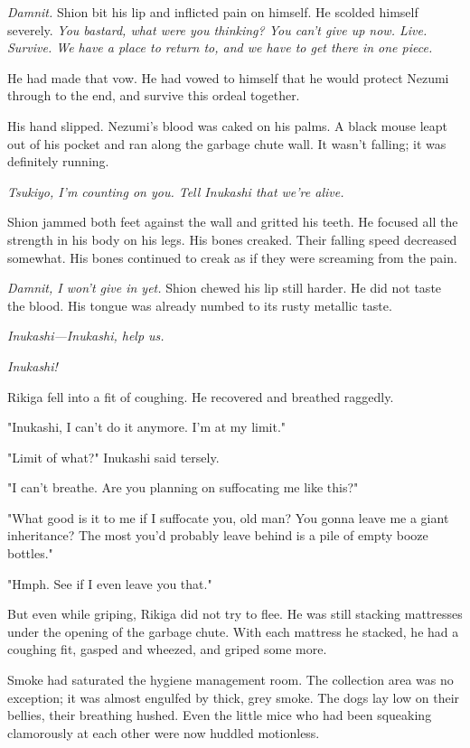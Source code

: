 \emph{Damnit.} Shion bit his lip and inflicted pain on himself. He scolded
himself severely. \emph{You bastard, what were you thinking? You can't give up
now. Live. Survive. We have a place to return to, and we have to get
there in one piece.}

He had made that vow. He had vowed to himself that he would protect
Nezumi through to the end, and survive this ordeal together.

His hand slipped. Nezumi's blood was caked on his palms. A black mouse
leapt out of his pocket and ran along the garbage chute wall. It wasn't
falling; it was definitely running.

\emph{Tsukiyo, I'm counting on you. Tell Inukashi that we're alive.}

Shion jammed both feet against the wall and gritted his teeth. He
focused all the strength in his body on his legs. His bones creaked.
Their falling speed decreased somewhat. His bones continued to creak as
if they were screaming from the pain.

\emph{Damnit, I won't give in yet.} Shion chewed his lip still harder. He did
not taste the blood. His tongue was already numbed to its rusty metallic
taste.

\emph{Inukashi---Inukashi, help us.}

\emph{Inukashi!}

\mybreak

Rikiga fell into a fit of coughing. He recovered and breathed raggedly.

"Inukashi, I can't do it anymore. I'm at my limit."

"Limit of what?" Inukashi said tersely.

"I can't breathe. Are you planning on suffocating me like this?"

"What good is it to me if I suffocate you, old man? You gonna leave me a
giant inheritance? The most you'd probably leave behind is a pile of
empty booze bottles."

"Hmph. See if I even leave you that."

But even while griping, Rikiga did not try to flee. He was still
stacking mattresses under the opening of the garbage chute. With each
mattress he stacked, he had a coughing fit, gasped and wheezed, and
griped some more.

Smoke had saturated the hygiene management room. The collection area was
no exception; it was almost engulfed by thick, grey smoke. The dogs lay
low on their bellies, their breathing hushed. Even the little mice who
had been squeaking clamorously at each other were now huddled
motionless.

